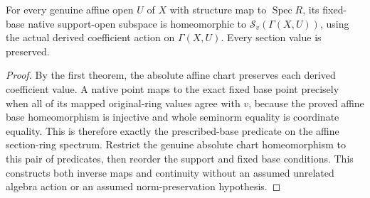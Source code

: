 \begin{theorem}
\label{scheme:relative-affine-open-homeomorphism}
\leanok
{}
For every genuine affine open $U$ of $X$ with structure map to
$\operatorname{Spec}R$, its fixed-base native support-open subspace is
homeomorphic to $\mathcal S_v(\Gamma(X,U))$, using the actual derived
coefficient action on $\Gamma(X,U)$. Every section value is preserved.
\end{theorem}
\begin{proof}
By the first theorem, the absolute affine chart preserves each derived
coefficient value. A native point maps to the exact fixed base point precisely
when all of its mapped original-ring values agree with $v$, because the
proved affine base homeomorphism is injective and whole seminorm equality is
coordinate equality. This is therefore exactly the prescribed-base predicate
on the affine section-ring spectrum. Restrict the genuine absolute chart
homeomorphism to this pair of predicates, then reorder the support and fixed
base conditions. This constructs both inverse maps and continuity without an
assumed unrelated algebra action or an assumed norm-preservation hypothesis.
\end{proof}


